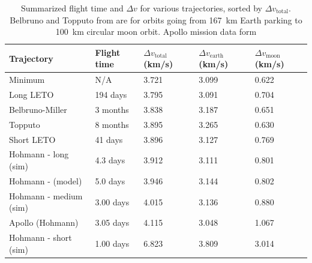 \begin{table}
    \begin{tabular}{|l|l|l|l|l|}
    \hline
    Trajectory                    & Flight time             & $\Delta v_{\text{total}}$ (\scriptsize{km/s)} & $\Delta v_{\text{earth}}$ (\scriptsize{km/s)} & $\Delta v_{\text{moon}}$ (\scriptsize{km/s)} \\ \hline
    Minimum                       & N/A                     & 3.721                     & 3.099                     & 0.622                    \\ \hline
    Long LETO                     & 194 days  & 3.795                     & 3.091                     & 0.704                    \\ \hline
    Belbruno-Miller               & 3 months                & 3.838                     & 3.187                     & 0.651                    \\ \hline
    Topputo                       & 8 months                & 3.895                     & 3.265                     & 0.630                    \\ \hline
    Short LETO                    & 41 days                 & 3.896                     & 3.127                     & 0.769                    \\ \hline
    Hohmann - long (sim)   & 4.3 days                & 3.912                     & 3.111                     & 0.801                    \\ \hline
    Hohmann - (model)      & 5.0 days                & 3.946                     & 3.144                     & 0.802                    \\ \hline
    Hohmann - medium (sim) & 3.00 days               & 4.015                     & 3.136                     & 0.880                    \\ \hline
    Apollo (Hohmann)      & 3.05 days               & 4.115                     & 3.048                     & 1.067                    \\ \hline
    Hohmann - short (sim)  & 1.00 days               & 6.823                     & 3.809                     & 3.014                    \\ \hline
\end{tabular}
\caption{Summarized flight time and $\Delta v$ for various trajectories, sorted by $\Delta v_{\text{total}}$. Belbruno and Topputo from \cite{Juul2008} are for orbits going from \SI{167}{\km} Earth parking to \SI{100}{\km} circular moon orbit. Apollo mission data form \cite{NASA1966} \cite{apollo-timeline}}
\label{tab:results}
\end{table}
